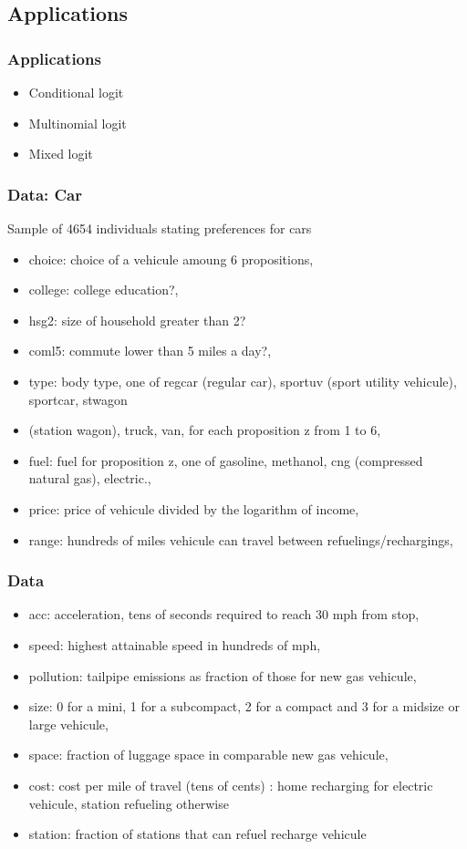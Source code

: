 \documentclass{beamer}
\newcommand{\1}{\mathbb{1}}
\begin{document}
\subsection{Applications}

\begin{frame}
\end{frame}

\begin{frame}\frametitle{Applications}
\begin{itemize}
 \item Conditional logit
 \item Multinomial logit
 \item Mixed logit
\end{itemize}
\end{frame}

\begin{frame}\frametitle{Data: Car}
Sample of 4654 individuals stating preferences for cars
\begin{itemize}
 \item choice: choice of a vehicule amoung 6 propositions,
 \item college: college education?,
\item hsg2: size of household greater than 2?
\item coml5: commute lower than 5 miles a day?,
\item type: body type, one of regcar (regular car), sportuv (sport utility vehicule), sportcar, stwagon
\item (station wagon), truck, van, for each proposition z from 1 to 6,
\item fuel: fuel for proposition z, one of gasoline, methanol, cng (compressed natural gas), electric.,
\item price: price of vehicule divided by the logarithm of income,
\item range: hundreds of miles vehicule can travel between refuelings/rechargings,
\end{itemize}
\end{frame}

\begin{frame}\frametitle{Data}
\begin{itemize}
\item acc: acceleration, tens of seconds required to reach 30 mph from stop,
\item speed: highest attainable speed in hundreds of mph,
\item pollution: tailpipe emissions as fraction of those for new gas vehicule,
\item size: 0 for a mini, 1 for a subcompact, 2 for a compact and 3 for a midsize or large vehicule,
\item space: fraction of luggage space in comparable new gas vehicule,
\item cost: cost per mile of travel (tens of cents) : home recharging for electric vehicule, station
refueling otherwise
\item station: fraction of stations that can refuel recharge vehicule
\end{itemize}
\end{frame}
\end{document}
